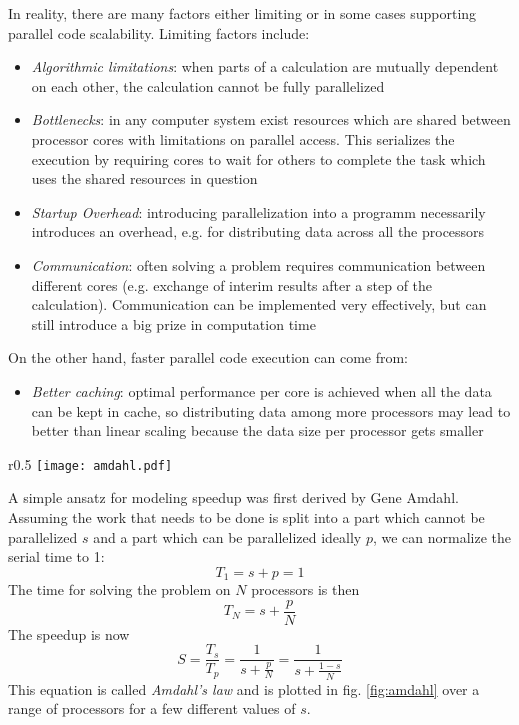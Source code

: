 \documentclass[main.tex]{subfiles}
\begin{document}
In reality, there are many factors either limiting or in some cases supporting parallel code scalability. Limiting factors include:
\begin{itemize}
    \item \emph{Algorithmic limitations}: when parts of a calculation are mutually dependent on each other, the calculation cannot be fully parallelized
    \item \emph{Bottlenecks}: in any computer system exist resources which are shared between processor cores with limitations on parallel access. This serializes the execution by requiring cores to wait for others to complete the task which uses the shared resources in question
    \item \emph{Startup Overhead}: introducing parallelization into a programm necessarily introduces an overhead, e.g. for distributing data across all the processors
    \item \emph{Communication}: often solving a problem requires communication between different cores (e.g. exchange of interim results after a step of the calculation). Communication can be implemented very effectively, but can still introduce a big prize in computation time
\end{itemize}
On the other hand, faster parallel code execution can come from:
\begin{itemize}
    \item \emph{Better caching}: optimal performance per core is achieved when all the data can be kept in cache, so distributing data among more processors may lead to better than linear scaling because the data size per processor gets smaller
\end{itemize}

\begin{wrapfigure}{r}{0.5\textwidth}
    \centering
    \texttt{[image: amdahl.pdf]}
    \label{fig:amdahl}
    \caption{Amdahl's law for different portions of not parallelizable workload \(s\)}
\end{wrapfigure}

A simple ansatz for modeling speedup was first derived by Gene Amdahl.
Assuming the work that needs to be done is split into a part which cannot be parallelized \(s\) and a part which can be parallelized ideally \(p\), we can normalize the serial time to 1:
\begin{equation}
    T_1 = s + p = 1
\end{equation}
The time for solving the problem on \(N\) processors is then
\begin{equation}
    T_N = s + \frac{p}{N}
\end{equation}
The speedup is now
\begin{equation}\label{eq:amdahls_law}
    S = \frac{T_s}{T_p} = \frac{1}{s + \frac{p}{N}} = \frac{1}{s + \frac{1 - s}{N}}
\end{equation}
This equation is called \emph{Amdahl's law} and is plotted in fig. \ref{fig:amdahl} over a range of processors for a few different values of \(s\).
\end{document}
